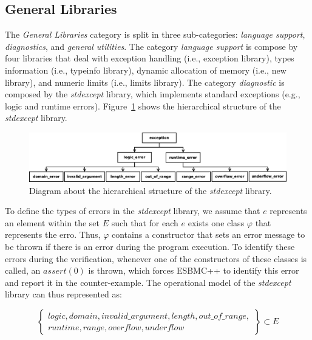 \documentclass[a4paper]{llncs}
\begin{document}
\subsection{General Libraries}

The \textit{General Libraries} category is split in three 
sub-categories: \textit{language support}, \textit{diagnostics}, 
and \textit{general utilities}. The category \textit{language support} 
is compose by four libraries that deal with exception handling 
(i.e., exception library), types information (i.e., typeinfo library), 
dynamic allocation of memory (i.e., new library), and numeric limits 
(i.e., limits library). The category \textit{diagnostic} is composed by 
the \textit{stdexcept} library, which implements standard exceptions 
(e.g., logic and runtime errors). Figure~\ref{figure:stdexcept}
shows the hierarchical structure of the \textit{stdexcept} library.

\begin{figure}[ht]
\centering
\includegraphics[scale=0.23]{figures/stdexcept.eps}
\caption{Diagram about the hierarchical structure of the \textit{stdexcept} library.}
\label{figure:stdexcept}
\end{figure}

To define the types of errors in the \textit{stdexcept} library, we assume that 
$e$ represents an element within the set $E$ such that for each $e$ exists one class 
$\varphi$ that represents the erro. Thus, $\varphi$ contains a constructor that sets an 
error message to be thrown if there is an error during the program execution. 
To identify these errors during the verification, whenever one of the 
constructors of these classes is called, an $assert(0)$ is thrown, which forces ESBMC++ to 
identify this error and report it in the counter-example. The operational model of the 
\textit{stdexcept} library can thus represented as:

\begin{equation}
\label{kind-of-exceptions}
\left\{ \begin{array}{ll} 
              logic, domain, invalid\_argument, length, out\_of\_range,\\ runtime, range, overflow, underflow
        \end{array} \right\} \subset E
\end{equation}
\end{document}
